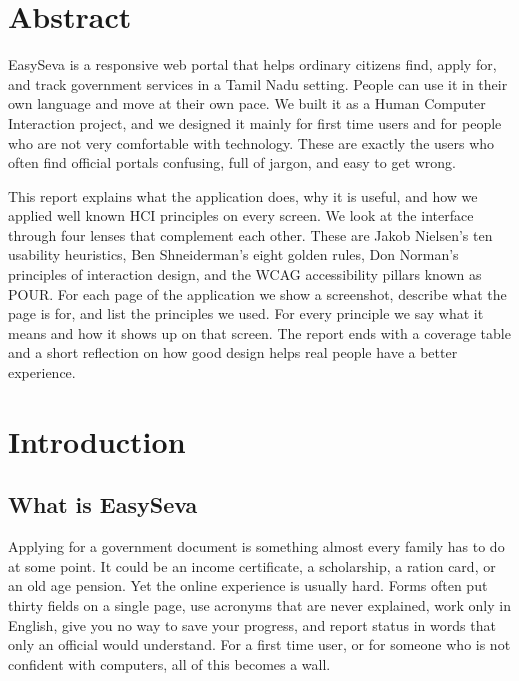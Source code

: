 \documentclass[12pt,a4paper]{article}
\begin{document}
\tableofcontents
\newpage

\section{Abstract}
EasySeva is a responsive web portal that helps ordinary citizens find, apply for,
and track government services in a Tamil Nadu setting. People can use it in their
own language and move at their own pace. We built it as a Human Computer
Interaction project, and we designed it mainly for first time users and for people
who are not very comfortable with technology. These are exactly the users who
often find official portals confusing, full of jargon, and easy to get wrong.

This report explains what the application does, why it is useful, and how we
applied well known HCI principles on every screen. We look at the interface
through four lenses that complement each other. These are Jakob Nielsen's ten
usability heuristics, Ben Shneiderman's eight golden rules, Don Norman's
principles of interaction design, and the WCAG accessibility pillars known as
POUR. For each page of the application we show a screenshot, describe what the page
is for, and list the principles we used. For every principle we say what it means
and how it shows up on that screen. The report ends with a coverage table and a
short reflection on how good design helps real people have a better experience.

\section{Introduction}

\subsection{What is EasySeva}
Applying for a government document is something almost every family has to do at
some point. It could be an income certificate, a scholarship, a ration card, or an
old age pension. Yet the online experience is usually hard. Forms often put thirty
fields on a single page, use acronyms that are never explained, work only in
English, give you no way to save your progress, and report status in words that
only an official would understand. For a first time user, or for someone who is
not confident with computers, all of this becomes a wall.
\end{document}
